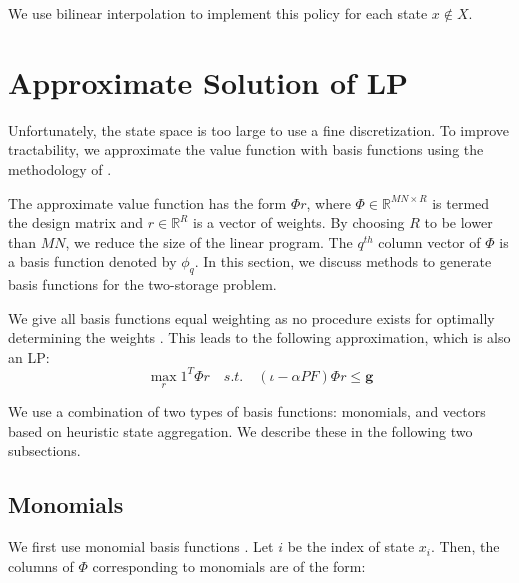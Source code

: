 \documentclass[conference]{IEEEtran}
\begin{document}
We use bilinear interpolation to implement this policy for each state $x\not\in X$. %



\section{Approximate Solution of LP}
Unfortunately, the state space is too large to use a fine discretization. To improve tractability, we approximate the value function with basis functions using the methodology of \cite{deFarias:2003:LPA:970869.970918}.

The approximate value function has the form $\Phi r$, where $\Phi \in \mathbb{R}^{MN\times R}$ is termed the design matrix and $r\in \mathbb{R}^R$ is a vector of weights. By choosing $R$ to be lower than $MN$, we reduce the size of the linear program. The $q^{th}$ column vector of $\Phi$ is a basis function denoted by $\phi_{q}$. In this section, we discuss methods to generate basis functions for the two-storage problem.

We give all basis functions equal weighting as no procedure exists for optimally determining the weights \cite{deFarias:2003:LPA:970869.970918, PatrascuReluEugen2004}. This leads to the following approximation, which is also an LP:
\begin{equation} \label{eq:ApproxLP}
    \max_{r} 1^{T} \Phi r
    \hspace{1em}s.t.\hspace{1em}
    (\iota-\alpha PF)\Phi r \leq \boldsymbol{g}
\end{equation}

We use a combination of two types of basis functions: monomials, and vectors based on heuristic state aggregation. We describe these in the following two subsections.

\subsection{Monomials}
    We first use monomial basis functions \cite{bertsekas1995dynamic,478953}. Let $i$ be the index of state $x_{i}$. Then, the columns of $\Phi$ corresponding to monomials are of the form:
	
\end{document}
